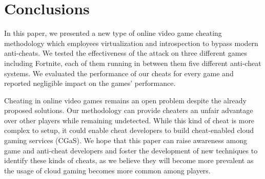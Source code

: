 

\section{Conclusions}
\label{sec:conclusions}

In this paper, we presented \frameworkName a new type of online video game cheating methodology which employees virtualization and introspection to bypass modern anti-cheats. We tested the effectiveness of the attack on three different games including Fortnite, each of them running in between them five different anti-cheat systems. We evaluated the performance of our cheats for every game and reported negligible impact on the games' performance. 

Cheating in online video games remains an open problem despite the already proposed solutions. Our methodology can provide cheaters an unfair advantage over other players while remaining undetected. While this kind of cheat is more complex to setup, it could enable cheat developers to build cheat-enabled cloud gaming services (CGaS). We hope that this paper can raise awareness among game and anti-cheat developers and foster the development of new techniques to identify these kinds of cheats, as we believe they will become more prevalent as the usage of cloud gaming becomes more common among players.